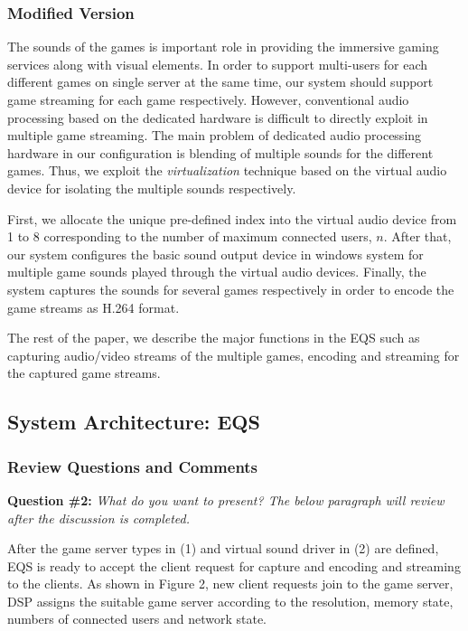 \documentclass[twocolumn]{article}
\begin{document}
\subsubsection{Modified Version}
The sounds of the games is important role in providing the immersive gaming services along with visual elements.
In order to support multi-users for each different games on single server at the same time, our system should support game streaming for each game respectively.
However, conventional audio processing based on the dedicated hardware is difficult to directly exploit in multiple game streaming.
The main problem of dedicated audio processing hardware in our configuration is blending of multiple sounds for the different games.
Thus, we exploit the \emph{virtualization} technique based on the virtual audio device for isolating the multiple sounds respectively. 

First, we allocate the unique pre-defined index into the virtual audio device from 1 to 8  corresponding to the number of maximum connected users, $n$.
After that, our system configures the basic sound output device in windows system for multiple game sounds played through the virtual audio devices. 
Finally, the system captures the sounds for several games respectively in order to encode the game streams as H.264 format.

The rest of the paper, we describe the major functions in the EQS such as capturing audio/video streams of the multiple games, encoding and streaming for the captured game streams.

\subsection{System Architecture: EQS}
\subsubsection{Review Questions and Comments}
\noindent
{\bf Question \#2:} \emph{What do you want to present? The below paragraph will review after the discussion is completed.}



After the game server types in (1) and virtual sound driver in (2) are defined, EQS is ready to accept the client request for capture and encoding and streaming to the clients. As shown in  Figure 2, new client requests join to the game server, DSP assigns the suitable game server according to the resolution, memory state, numbers of connected users and network state. 
\end{document}
